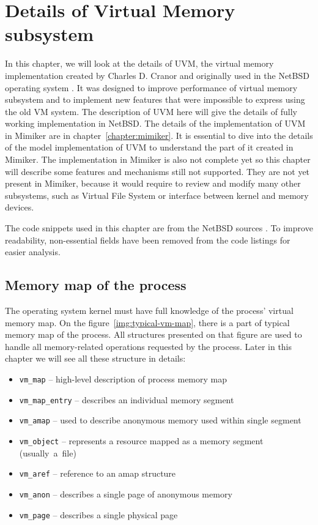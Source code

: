 \chapter{Details of Virtual Memory subsystem}
\label{chapter:details}

In this chapter, we will look at the details of UVM, the virtual memory implementation created by Charles D. Cranor
and originally used in the NetBSD operating system \cite{cranor}.
It was designed to improve performance of virtual memory subsystem and to implement new features that were impossible to express using the old VM system.
The description of UVM here will give the details of fully working implementation in NetBSD.
The details of the implementation of UVM in Mimiker are in chapter~\ref{chapter:mimiker}.
It is essential to dive into the details of the model implementation of UVM to understand the part of it created in Mimiker.
The implementation in Mimiker is also not complete yet so this chapter will describe some features and mechanisms still not supported.
They are not yet present in Mimiker, because it would require to review and modify many other subsystems,
such as Virtual File System or interface between kernel and memory devices.

The code snippets used in this chapter are from the NetBSD sources \cite{netbsd:sources}.
To improve readability, non-essential fields have been removed from the code listings for easier analysis.

\section{Memory map of the process}

The operating system kernel must have full knowledge of the process' virtual memory map.
On the figure~\ref{img:typical-vm-map}, there is a part of typical memory map of the process.
All structures presented on that figure are used to handle all memory-related operations requested by the process.
Later in this chapter we will see all these structure in details:

\begin{samepage}
\begin{itemize}
  \item \texttt{vm_map} -- high-level description of process memory map
  \item \texttt{vm_map_entry} -- describes an individual memory segment
  \item \texttt{vm_amap} -- used to describe anonymous memory used within single segment
  \item \texttt{vm_object} -- represents a resource mapped as a memory segment (usually~a~file)
  \item \texttt{vm_aref} -- reference to an amap structure
  \item \texttt{vm_anon} -- describes a single page of anonymous memory
  \item \texttt{vm_page} -- describes a single physical page
\end{itemize}
\end{samepage}

